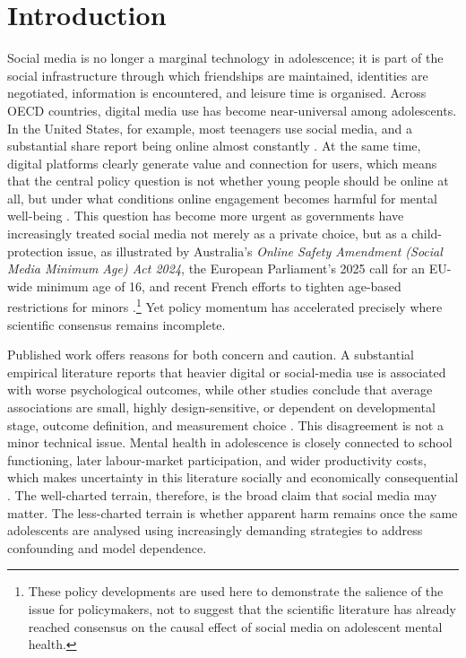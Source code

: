 \documentclass[11pt,oneside,a4paper]{book}
\newcommand{\bodychapter}[1]{%
  \chapter{#1}%
}
\begin{document}
\mainmatter

\bodychapter{Introduction}

Social media is no longer a marginal technology in adolescence; it is part of the social infrastructure through which friendships are maintained, identities are negotiated, information is encountered, and leisure time is organised. Across OECD countries, digital media use has become near-universal among adolescents. In the United States, for example, most teenagers use social media, and a substantial share report being online almost constantly \citep{oecd2025children_digital,pew2024teens}. At the same time, digital platforms clearly generate value and connection for users, which means that the central policy question is not whether young people should be online at all, but under what conditions online engagement becomes harmful for mental well-being \citep{brynjolfsson2019digitalgoods,surgeongeneral2023socialmedia}. This question has become more urgent as governments have increasingly treated social media not merely as a private choice, but as a child-protection issue, as illustrated by Australia's \textit{Online Safety Amendment (Social Media Minimum Age) Act 2024}, the European Parliament's 2025 call for an EU-wide minimum age of 16, and recent French efforts to tighten age-based restrictions for minors \citep{australia2024minageact,euparliament2025minage16,reuters2026francecurb}.\footnote{These policy developments are used here to demonstrate the salience of the issue for policymakers, not to suggest that the scientific literature has already reached consensus on the causal effect of social media on adolescent mental health.} Yet policy momentum has accelerated precisely where scientific consensus remains incomplete.

Published work offers reasons for both concern and caution. A substantial empirical literature reports that heavier digital or social-media use is associated with worse psychological outcomes, while other studies conclude that average associations are small, highly design-sensitive, or dependent on developmental stage, outcome definition, and measurement choice \citep{twenge2018newmedia,orbenprzybylski2019association,allcott2020welfare,braghieri2022socialmedia,orben2020review,orben2022windows,beyens2020effect}. This disagreement is not a minor technical issue. Mental health in adolescence is closely connected to school functioning, later labour-market participation, and wider productivity costs, which makes uncertainty in this literature socially and economically consequential \citep{oecd2012mentalhealthwork,whoilo2022mentalhealthwork}. The well-charted terrain, therefore, is the broad claim that social media may matter. The less-charted terrain is whether apparent harm remains once the same adolescents are analysed using increasingly demanding strategies to address confounding and model dependence.
\end{document}

